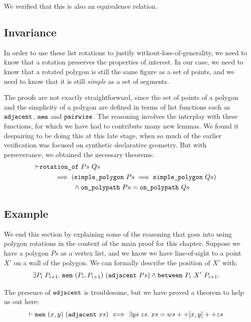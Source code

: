 We verified that this is also an equivalence relation.

\subsection{Invariance}
In order to use these list rotations to justify without-loss-of-generality, we need to know that a rotation preserves the properties of interest. In our case, we need to know that a rotated polygon is still the same figure as a set of points, and we need to know that it is still \emph{simple} as a set of segments. 

The proofs are not exactly straightforward, since the set of points of a polygon and the simplicity of a polygon are defined in terms of list functions such as $\texttt{adjacent}$, $\texttt{mem}$ and $\texttt{pairwise}$. The reasoning involves the interplay with these functions, for which we have had to contribute many new lemmas. We found it despairing to be doing this at this late stage, when so much of the earlier verification was focused on synthetic declarative geometry. But with perseverance, we obtained the necessary theorems:
\begin{equation}\label{eq:PolygonRotateInvariant}
\begin{aligned}
\vdash      &\texttt{rotation\_of}\ Ps\ Qs\\
    &\qquad\implies (\texttt{simple\_polygon}\ Ps \implies \texttt{simple\_polygon}\ Qs)\\
    &\qquad\qquad\quad\wedge \texttt{on\_polypath}\ Ps = \texttt{on\_polypath}\ Qs
  \end{aligned}
\end{equation}

\subsection{Example}
We end this section by explaining some of the reasoning that goes into using polygon rotations in the context of the main proof for this chapter. Suppose we have a polygon $Ps$ as a vertex list, and we know we have line-of-sight to a point $X'$ on a wall of the polygon. We can formally describe the position of $X'$ with:
\begin{displaymath}
  \exists P_i\; P_{i+1}.\; \texttt{mem}\ (P_i,P_{i+1})\ (\texttt{adjacent}\ Ps) \wedge \texttt{between}\ P_i\ X'\ P_{i+1}.
\end{displaymath}

The presence of $\texttt{adjacent}$ is troublesome, but we have proved a theorem to help us out here:
\begin{equation*}
\vdash  \texttt{mem}\ (x,y)\ (\texttt{adjacent}\ xs) \iff 
\exists ys\; zs.\; xs = ws ++ [x,y] ++ zs
\end{equation*}

